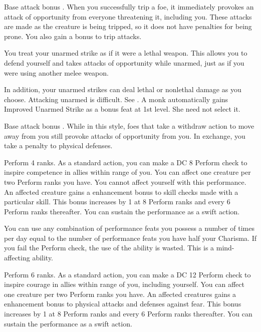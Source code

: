  Base attack bonus .
 When you successfully trip a foe, it immediately provokes an attack of opportunity from everyone threatening it, including you. These attacks are made as the creature is being tripped, so it does not have penalties for being prone. You also gain a  bonus to trip attacks.

 You treat your unarmed strike as if it were a lethal weapon. This allows you to defend yourself and takes attacks of opportunity while unarmed, just as if you were using another melee weapon.

In addition, your unarmed strikes can deal lethal or nonlethal damage as you choose.
 Attacking unarmed is difficult. See .
 A monk automatically gains Improved Unarmed Strike as a bonus feat at 1st level. She need not select it.

\featpre Base attack bonus .
\featben While in this style, foes that take a withdraw action to move away from you still provoke attacks of opportunity from you. In exchange, you take a  penalty to physical defenses.

\featpre Perform 4 ranks.
\featben As a standard action, you can make a DC 8 Perform check to inspire competence in allies within \rngmed range of you. You can affect one creature per two Perform ranks you have. You cannot affect yourself with this performance. An affected creature gains a  enhancement bonus to skill checks made with a particular skill. This bonus increases by 1 at 8 Perform ranks and every 6 Perform ranks thereafter. You can sustain the performance as a swift action.

You can use any combination of performance feats you possess a number of times per day equal to the number of performance feats you have \add half your Charisma. If you fail the Perform check, the use of the ability is wasted. This is a mind-affecting ability.

\featpre Perform 6 ranks.
\featben As a standard action, you can make a DC 12 Perform check to inspire courage in allies within \rngmed range of you, including yourself. You can affect one creature per two Perform ranks you have. An affected creatures gains a  enhancement bonus to physical attacks and defenses against fear. This bonus increases by 1 at 8 Perform ranks and every 6 Perform ranks thereafter. You can sustain the performance as a swift action.

